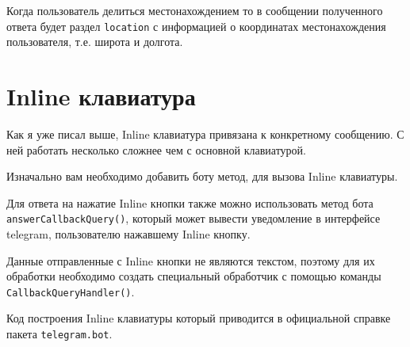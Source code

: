 \documentclass[
]{book}
\begin{document}
Когда пользователь делиться местонахождением то в сообщении полученного ответа будет раздел \texttt{location} с информацией о координатах местонахождения пользователя, т.е. широта и долгота.

\section{Inline клавиатура}\label{inline-ux43aux43bux430ux432ux438ux430ux442ux443ux440ux430}

Как я уже писал выше, Inline клавиатура привязана к конкретному сообщению. С ней работать несколько сложнее чем с основной клавиатурой.

Изначально вам необходимо добавить боту метод, для вызова Inline клавиатуры.

Для ответа на нажатие Inline кнопки также можно использовать метод бота \texttt{answerCallbackQuery()}, который может вывести уведомление в интерфейсе telegram, пользователю нажавшему Inline кнопку.

Данные отправленные с Inline кнопки не являются текстом, поэтому для их обработки необходимо создать специальный обработчик с помощью команды \texttt{CallbackQueryHandler()}.

Код построения Inline клавиатуры который приводится в официальной справке пакета \texttt{telegram.bot}.
\end{document}
